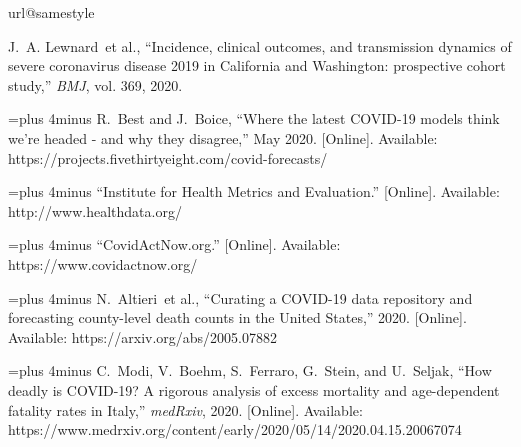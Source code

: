 \documentclass[11pt]{article}
\begin{document}
\begin{thebibliography}{10}
\providecommand{\url}[1]{#1}
\csname url@samestyle\endcsname
\providecommand{\newblock}{\relax}
\providecommand{\bibinfo}[2]{#2}
\providecommand{\BIBentrySTDinterwordspacing}{\spaceskip=0pt\relax}
\providecommand{\BIBentryALTinterwordstretchfactor}{4}
\providecommand{\BIBentryALTinterwordspacing}{\spaceskip=\fontdimen2\font plus
\BIBentryALTinterwordstretchfactor\fontdimen3\font minus
  \fontdimen4\font\relax}
\providecommand{\BIBforeignlanguage}[2]{{%
\expandafter\ifx\csname l@#1\endcsname\relax
\typeout{** WARNING: IEEEtran.bst: No hyphenation pattern has been}%
\typeout{** loaded for the language `#1'. Using the pattern for}%
\typeout{** the default language instead.}%
\else
\language=\csname l@#1\endcsname
\fi
#2}}
\providecommand{\BIBdecl}{\relax}
\BIBdecl

J.~A. Lewnard~et al., ``{Incidence, clinical outcomes, and transmission
  dynamics of severe coronavirus disease 2019 in California and Washington:
  prospective cohort study},'' \emph{BMJ}, vol. 369, 2020.

\BIBentryALTinterwordspacing
R.~Best and J.~Boice, ``{Where the latest COVID-19 models think we're headed -
  and why they disagree},'' May 2020. [Online]. Available:
  \url{https://projects.fivethirtyeight.com/covid-forecasts/}
\BIBentrySTDinterwordspacing

\BIBentryALTinterwordspacing
``{Institute for Health Metrics and Evaluation}.'' [Online]. Available:
  \url{http://www.healthdata.org/}
\BIBentrySTDinterwordspacing

\BIBentryALTinterwordspacing
``{CovidActNow.org}.'' [Online]. Available: \url{https://www.covidactnow.org/}
\BIBentrySTDinterwordspacing

\BIBentryALTinterwordspacing
N.~Altieri~et al., ``{Curating a COVID-19 data repository and forecasting
  county-level death counts in the United States},'' 2020. [Online]. Available:
  \url{https://arxiv.org/abs/2005.07882}
\BIBentrySTDinterwordspacing

\BIBentryALTinterwordspacing
C.~Modi, V.~Boehm, S.~Ferraro, G.~Stein, and U.~Seljak, ``{How deadly is
  COVID-19? A rigorous analysis of excess mortality and age-dependent fatality
  rates in Italy},'' \emph{medRxiv}, 2020. [Online]. Available:
  \url{https://www.medrxiv.org/content/early/2020/05/14/2020.04.15.20067074}
\BIBentrySTDinterwordspacing


\end{thebibliography}
\end{document}
